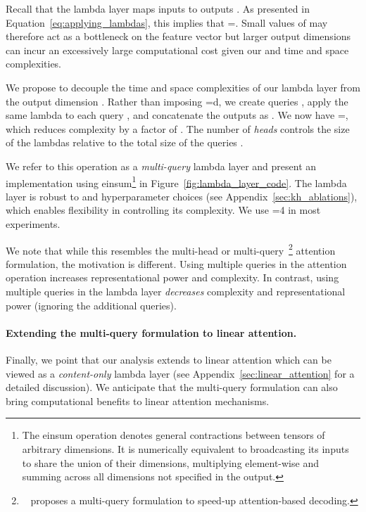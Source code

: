 \documentclass{article} \usepackage{iclr2021_conference,times}
\begin{document}
Recall that the lambda layer maps inputs  to outputs .
As presented in Equation~\ref{eq:applying_lambdas}, this implies that =.
Small values of  may therefore act as a bottleneck on the feature vector  but larger output dimensions  can incur an excessively large computational cost given our  and  time and space complexities.

We propose to decouple the time and space complexities of our lambda layer from the output dimension .
Rather than imposing =d, we create  queries , apply the same lambda  to each query , and concatenate the outputs as .
We now have =, which reduces complexity by a factor of .
The number of \emph{heads}  controls the size of the lambdas  relative to the total size of the queries .

We refer to this operation as a \emph{multi-query} lambda layer and present an implementation using einsum\footnote{
The einsum operation denotes general contractions between tensors of arbitrary dimensions.
It is numerically equivalent to broadcasting its inputs to share the union of their dimensions, multiplying element-wise and summing across all dimensions not specified in the output.
} in Figure~\ref{fig:lambda_layer_code}.
The lambda layer is robust to  and  hyperparameter choices (see Appendix~\ref{sec:kh_ablations}), which enables flexibility in controlling its complexity.
We use =4 in most experiments.

We note that while this resembles the multi-head or multi-query~\citep{shazeer2019fast}\footnote{~\citep{shazeer2019fast} proposes a multi-query formulation to speed-up attention-based decoding.}
attention formulation, the motivation is different.
Using multiple queries in the attention operation increases representational power and complexity.
In contrast, using multiple queries in the lambda layer \emph{decreases} complexity and representational power (ignoring the additional queries).

\vspace{-0.1cm}
\paragraph{Extending the multi-query formulation to linear attention.}
Finally, we point that our analysis extends to linear attention which can be viewed as a \emph{content-only} lambda layer (see Appendix~\ref{sec:linear_attention} for a detailed discussion).
We anticipate that the multi-query formulation can also bring computational benefits to linear attention mechanisms.
\end{document}

